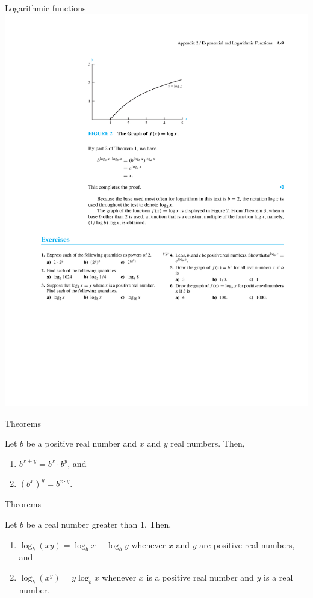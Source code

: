 \documentclass{beamer}
\theoremstyle{definition}
\begin{document}
\begin{frame}{Logarithmic functions}
    \centering \includegraphics[trim={2cm 20cm 4cm 3cm},clip,width=\linewidth]{a-9}
\end{frame}

\begin{frame}{Theorems}
    \begin{theorem}\label{theo:one}
        Let $b$ be a positive real number and $x$ and $y$ real numbers. Then,
        \begin{enumerate}
         \item $b^{x+y} = b^x \cdot b^y$, and
         \item $(b^x)^y = b^{x \cdot y}$.
        \end{enumerate}
    \end{theorem}

\end{frame}

\begin{frame}{Theorems}
    \begin{theorem}\label{theo:two}
        Let $b$ be a real number greater than 1. Then,
        \begin{enumerate}
         \item $\log_b (xy) = \log_b x + \log_b y$ whenever $x$ and $y$ are positive real numbers, and
         \item $\log_b (x^y) = y \log_b x$ whenever $x$ is a positive real number and $y$ is a real number.
        \end{enumerate}
    \end{theorem}
\end{frame}
\end{document}
